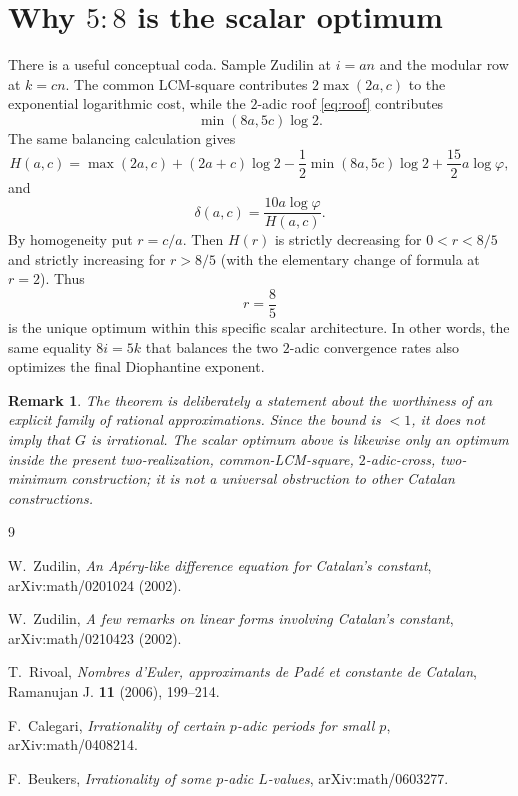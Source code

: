 \documentclass[11pt]{article}
\newtheorem{remark}[theorem]{Remark}
\newcommand{\phiG}{\varphi}
\begin{document}
\section{Why $5:8$ is the scalar optimum}

There is a useful conceptual coda.  Sample Zudilin at $i=an$ and the modular
row at $k=cn$.  The common LCM-square contributes $2\max(2a,c)$ to the
exponential logarithmic cost, while the $2$-adic roof \eqref{eq:roof}
contributes
\[
 \min(8a,5c)\log2.
\]
The same balancing calculation gives
\[
 H(a,c)=\max(2a,c)+(2a+c)\log2
 -\frac12\min(8a,5c)\log2
 +\frac{15}{2}a\log\phiG,
\]
and
\[
 \delta(a,c)=\frac{10a\log\phiG}{H(a,c)}.
\]
By homogeneity put $r=c/a$.  Then $H(r)$ is strictly decreasing for
$0<r<8/5$ and strictly increasing for $r>8/5$ (with the elementary change of
formula at $r=2$).  Thus
\[
 \boxed{r=\frac85}
\]
is the unique optimum within this specific scalar architecture.  In other
words, the same equality $8i=5k$ that balances the two $2$-adic convergence
rates also optimizes the final Diophantine exponent.

\begin{remark}
The theorem is deliberately a statement about the \emph{worthiness} of an
explicit family of rational approximations.  Since the bound is $<1$, it does
not imply that $G$ is irrational.  The scalar optimum above is likewise only
an optimum inside the present two-realization, common-LCM-square,
$2$-adic-cross, two-minimum construction; it is not a universal obstruction
to other Catalan constructions.
\end{remark}

\begin{thebibliography}{9}

W.~Zudilin,
\emph{An Ap\'ery-like difference equation for Catalan's constant},
arXiv:math/0201024 (2002).

W.~Zudilin,
\emph{A few remarks on linear forms involving Catalan's constant},
arXiv:math/0210423 (2002).

T.~Rivoal,
\emph{Nombres d'Euler, approximants de Pad\'e et constante de Catalan},
Ramanujan J. \textbf{11} (2006), 199--214.

F.~Calegari,
\emph{Irrationality of certain $p$-adic periods for small $p$},
arXiv:math/0408214.

F.~Beukers,
\emph{Irrationality of some $p$-adic $L$-values},
arXiv:math/0603277.

\end{thebibliography}
\end{document}
